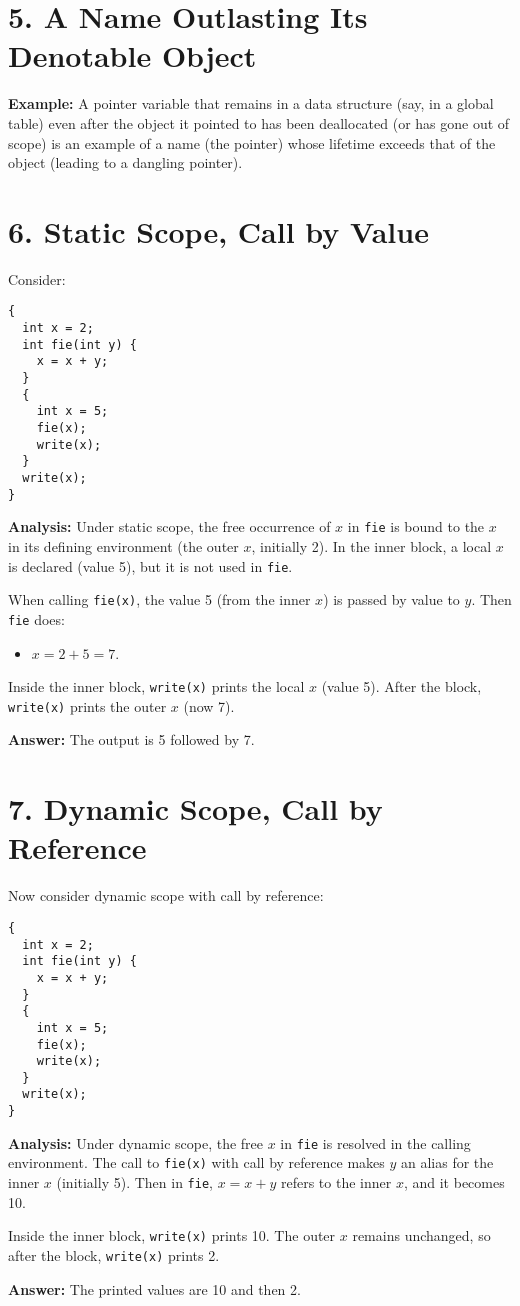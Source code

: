 \documentclass[12pt]{article}
\begin{document}
\section*{5. A Name Outlasting Its Denotable Object}
\textbf{Example:} A pointer variable that remains in a data structure (say, in a global table) even after the object it pointed to has been deallocated (or has gone out of scope) is an example of a name (the pointer) whose lifetime exceeds that of the object (leading to a dangling pointer).

\section*{6. Static Scope, Call by Value}
Consider:
\begin{verbatim}
{ 
  int x = 2;
  int fie(int y) {
    x = x + y;
  }
  { 
    int x = 5;
    fie(x);
    write(x);
  }
  write(x);
}
\end{verbatim}

\textbf{Analysis:}
Under static scope, the free occurrence of \( x \) in \texttt{fie} is bound to the \( x \) in its defining environment (the outer \( x \), initially 2). In the inner block, a local \( x \) is declared (value 5), but it is not used in \texttt{fie}.

When calling \texttt{fie(x)}, the value 5 (from the inner \( x \)) is passed by value to \( y \). Then \texttt{fie} does:
\begin{itemize}
  \item \( x = 2 + 5 = 7 \).
\end{itemize}

Inside the inner block, \texttt{write(x)} prints the local \( x \) (value 5). After the block, \texttt{write(x)} prints the outer \( x \) (now 7).

\textbf{Answer:} The output is 5 followed by 7.

\section*{7. Dynamic Scope, Call by Reference}
Now consider dynamic scope with call by reference:
\begin{verbatim}
{ 
  int x = 2;
  int fie(int y) {
    x = x + y;
  }
  { 
    int x = 5;
    fie(x);
    write(x);
  }
  write(x);
}
\end{verbatim}

\textbf{Analysis:}
Under dynamic scope, the free \( x \) in \texttt{fie} is resolved in the calling environment. The call to \texttt{fie(x)} with call by reference makes \( y \) an alias for the inner \( x \) (initially 5). Then in \texttt{fie}, \( x = x + y \) refers to the inner \( x \), and it becomes 10.

Inside the inner block, \texttt{write(x)} prints 10. The outer \( x \) remains unchanged, so after the block, \texttt{write(x)} prints 2.

\textbf{Answer:} The printed values are 10 and then 2.

\end{document}
